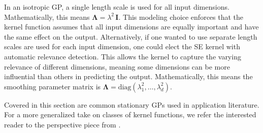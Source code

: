 \documentclass[journal=jacsat,manuscript=article]{achemso}
\begin{document}
{In an isotropic GP, a single length scale is used for all input dimensions. Mathematically, this means $\boldsymbol{\Lambda} = \lambda^2 \, \mathbf{I}$. This modeling choice enforces that the kernel function assumes that all input dimensions are equally important and have the same effect on the output. Alternatively, if one wanted to use separate length scales are used for each input dimension, one could elect the SE kernel with automatic relevance detection. This allows the kernel to capture the varying relevance of different dimensions, meaning some dimensions can be more influential than others in predicting the output. Mathematically, this means the smoothing parameter matrix is $\boldsymbol{\Lambda} = \text{diag}(\lambda_1^2,\dots,\lambda_d^2)$.

Covered in this section are common stationary GPs used in application literature. For a more generalized take on classes of kernel functions, we refer the interested reader to the perspective piece from \citeauthor{Genton} \cite{Genton}.

}
\end{document}
